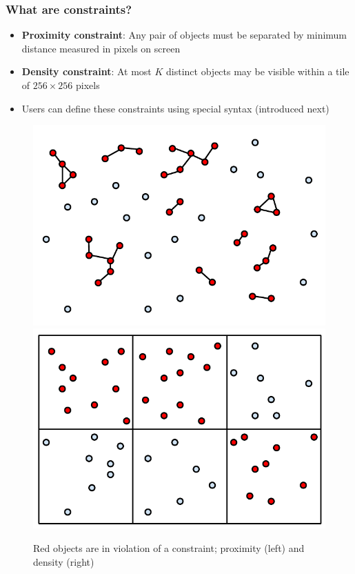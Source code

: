 \documentclass{beamer}
\begin{document}
\frame
{
  \frametitle{What are constraints?}
  \begin{itemize}
  \item \textbf{Proximity constraint}: Any pair of objects must be separated by minimum distance measured in pixels on screen
  \item \textbf{Density constraint}: At most $K$ distinct objects may be visible within a tile of $256 \times 256$ pixels
  \item Users can define these constraints using special syntax (introduced next)
  \end{itemize}
  \begin{center}
  \begin{figure}
  \label{fig:contraints}
  \includegraphics[scale=0.4]{figs/cvl-proximity.pdf} \includegraphics[scale=0.4]{figs/cvl-visibility.pdf}
  \caption{Red objects are in violation of a constraint; proximity (left) and density (right)}
  \end{figure}
  \end{center}
}
\end{document}

